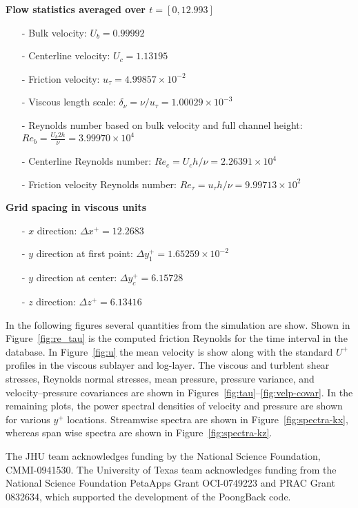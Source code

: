 \documentclass[11pt,letterpaper]{article}
\begin{document}
\vspace{1em}
\noindent \textbf{Flow statistics averaged over $t=[0,12.993]$}
\begin{itemize}
\itemsep0em
\item[-] Bulk velocity: $U_b = 0.99992$
\item[-] Centerline velocity: $U_c = 1.13195$
\item[-] Friction velocity: $u_\tau = 4.99857 \times 10^{-2}$
\item[-] Viscous length scale: $\delta_\nu = \nu/u_\tau = 1.00029 \times 10^{-3}$
\item[-] Reynolds number based on bulk velocity and full channel height: $Re_b=\frac{U_b 2h}{\nu} = 3.99970 \times 10^{4}$
\item[-] Centerline Reynolds number: $Re_c = U_c h / \nu= 2.26391 \times 10^{4}$
\item[-] Friction velocity Reynolds number: $Re_\tau = u_\tau h / \nu = 9.99713 \times 10^{2}$
\end{itemize}

\vspace{1em}
\noindent \textbf{Grid spacing in viscous units}
\begin{itemize}
\itemsep0em
\item[-] $x$ direction: $\Delta x^+ = 12.2683$
\item[-] $y$ direction at first point: $\Delta y_1^+ = 1.65259 \times 10^{-2}$
\item[-] $y$ direction at center: $\Delta y_c^+ = 6.15728$
\item[-] $z$ direction: $\Delta z^+ = 6.13416$
\end{itemize}

In the following figures several quantities from the simulation are show. Shown in Figure~\ref{fig:re_tau} is the computed friction Reynolds for the time interval in the database. In Figure~\ref{fig:u} the mean velocity is show along with the standard $U^+$ profiles in the viscous sublayer and log-layer. The viscous and turblent shear stresses, Reynolds normal stresses, mean pressure, pressure variance, and velocity--pressure covariances are shown in Figures~\ref{fig:tau}--\ref{fig:velp-covar}. In the remaining plots, the power spectral densities of velocity and pressure are shown for various $y^+$ locations. Streamwise spectra are shown in Figure~\ref{fig:spectra-kx}, whereas span wise spectra are shown in Figure~\ref{fig:spectra-kz}.

\vspace{0.4 cm}
 The JHU team acknowledges funding by the National Science Foundation, CMMI-0941530. The University of Texas team acknowledges funding from the National Science Foundation PetaApps Grant OCI-0749223 and PRAC Grant 0832634, which supported the development of the PoongBack code.
\end{document}
